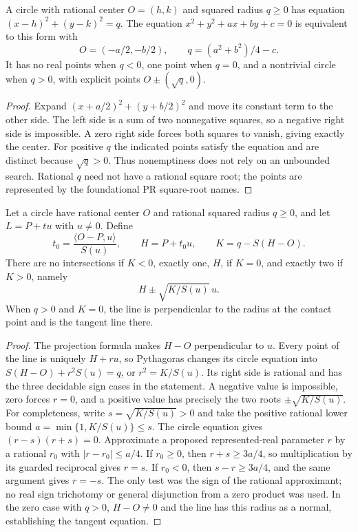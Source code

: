 \begin{theorem}
\label{geo:circle}
A circle with rational center $O=(h,k)$ and squared radius $q\ge0$ has
equation $(x-h)^2+(y-k)^2=q$.
The equation $x^2+y^2+ax+by+c=0$ is equivalent to this form with
\[
 O=(-a/2,-b/2),\qquad q=(a^2+b^2)/4-c.
\]
It has no real points when $q<0$, one point when $q=0$, and a nontrivial
circle when $q>0$, with explicit points $O\pm(\sqrt q,0)$.
\end{theorem}
\begin{proof}
Expand $(x+a/2)^2+(y+b/2)^2$ and move its constant term to the other
side. The left side is a sum of two nonnegative squares, so a negative
right side is impossible. A zero right side forces both squares to vanish,
giving exactly the center. For positive $q$ the indicated points satisfy
the equation and are distinct because $\sqrt q>0$. Thus nonemptiness does
not rely on an unbounded search. Rational $q$ need not have a rational square
root; the points are represented by the foundational PR square-root names.
\end{proof}

\begin{theorem}
\label{geo:line-circle}
Let a circle have rational center $O$ and rational squared radius $q\ge0$,
and let $L=P+tu$ with $u\ne0$. Define
\[
 t_0=\frac{\langle O-P,u\rangle}{S(u)},\qquad H=P+t_0u,\qquad
 K=q-S(H-O).
\]
There are no intersections if $K<0$, exactly one, $H$, if $K=0$, and
exactly two if $K>0$, namely
\[
 H\mathbin{\pm}\sqrt{K/S(u)}\,u.
\]
When $q>0$ and $K=0$, the line is perpendicular to the radius at the
contact point and is the tangent line there.
\end{theorem}
\begin{proof}
The projection formula makes $H-O$ perpendicular to $u$. Every point of
the line is uniquely $H+ru$, so Pythagoras changes its circle equation into
$S(H-O)+r^2S(u)=q$, or $r^2=K/S(u)$.
Its right side is rational and has the three decidable sign cases in the
statement. A negative value is impossible, zero forces $r=0$, and a positive
value has precisely the two roots $\pm\sqrt{K/S(u)}$.
For completeness, write $s=\sqrt{K/S(u)}>0$ and take the positive rational
lower bound $a=\min\{1,K/S(u)\}\le s$. The circle equation
gives $(r-s)(r+s)=0$. Approximate a proposed represented-real parameter $r$
by a rational $r_0$ with $|r-r_0|\le a/4$. If $r_0\ge0$, then
$r+s\ge3a/4$, so multiplication by its guarded reciprocal gives $r=s$.
If $r_0<0$, then $s-r\ge3a/4$, and the same argument gives $r=-s$.
The only test was the sign of the rational approximant; no real sign
trichotomy or general disjunction from a zero product was used.
In the zero case with $q>0$, $H-O\ne0$ and the line has this radius as
a normal, establishing the tangent equation.
\end{proof}

